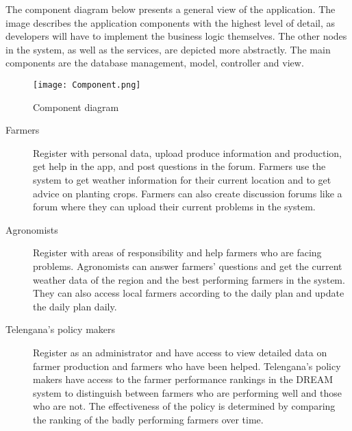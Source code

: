 \documentclass[../../main.tex]{subfiles}
\begin{document}
The component diagram below presents a general view of the application.  The image describes the application  components with the highest level of detail,  as developers will have to implement the business logic  themselves.  The  other  nodes  in  the  system,  as  well  as  the  services,  are  depicted  more  abstractly. The main components are the database management, model, controller and view. 


\begin{figure}[H]
    \centering
    \texttt{[image: Component.png]}
    \caption{
        Component diagram
    }
\end{figure}


\begin{description}
    
    \item[Farmers] Register with personal data, upload produce information and production, get help in the app, and post questions in the forum. Farmers use the system to get weather information for their current location and to
get advice on planting crops. Farmers can also create discussion forums like a forum where they can upload their current problems in the system. 

    \item[Agronomists] Register with areas of responsibility and help farmers who are facing problems. Agronomists can answer farmers’ questions and get the current weather data of the region and the best 
performing farmers in the system. They can also access local farmers according to the daily plan and update 
the daily plan daily.


    \item[Telengana’s policy makers]  Register as an administrator and have access to view detailed data on farmer production and farmers who have been helped. Telengana’s policy makers have access to the farmer performance rankings in the DREAM system to distinguish between farmers who are performing well and those who are not. The effectiveness of the policy is determined by comparing the ranking of the badly performing farmers over time.
  
  
  
\end{description}
\end{document}

